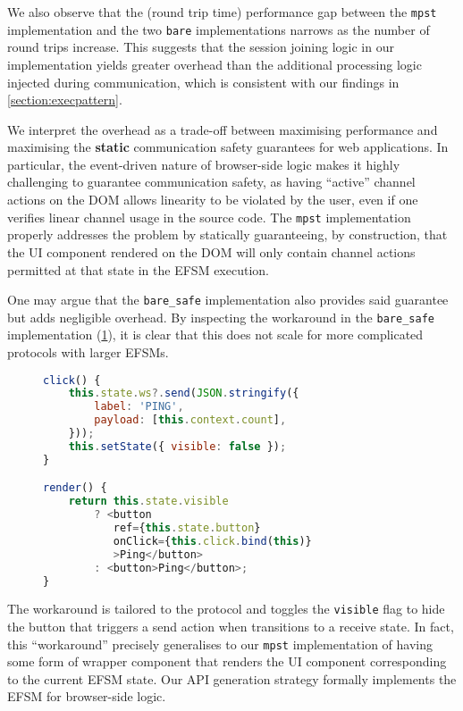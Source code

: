 We also observe that the (round trip time) performance gap between 
the \texttt{mpst} implementation and the two 
\texttt{bare} implementations narrows as the number of round trips 
increase. This suggests that the session joining logic in our
implementation yields greater overhead than the additional processing
logic injected during communication, which is consistent with 
our findings in \cref{section:execpattern}.

We interpret the overhead as a trade-off between maximising performance and
maximising the \textbf{static} communication safety guarantees for
web applications. In particular, the event-driven nature of 
browser-side logic makes it highly challenging to guarantee 
communication safety, as having ``active'' channel actions on the DOM
allows linearity to be violated by the user, even if one verifies
linear channel usage in the source code. The \texttt{mpst} implementation
properly addresses the problem by statically guaranteeing,
by construction, that the UI component rendered on the DOM will only
contain channel actions permitted at that state in the EFSM execution.

One may argue that the \texttt{bare_safe} implementation also
provides said guarantee but adds negligible overhead. 
By inspecting the workaround in the \texttt{bare_safe} implementation
(\cref{lst:workaround}),
it is clear that this does not scale for more complicated protocols with
larger EFSMs. 

\begin{figure}[!ht]
\begin{lstlisting}[language=javascript, tabsize=2]
click() {
	this.state.ws?.send(JSON.stringify({
		label: 'PING',
		payload: [this.context.count],
	}));
	this.setState({ visible: false });
}

render() {
	return this.state.visible 
		? <button
		   ref={this.state.button}
		   onClick={this.click.bind(this)}
		   >Ping</button>
		: <button>Ping</button>;
}
\end{lstlisting}
\label{lst:workaround}
\end{figure}

The workaround is tailored to the  protocol
and toggles the \texttt{visible} flag to hide the button that triggers
a send action when  transitions to a receive state.
In fact, this ``workaround'' precisely generalises to our 
\texttt{mpst} implementation of having some form of wrapper
component that renders the UI component corresponding to the
current EFSM state. Our API generation strategy formally implements
the EFSM for browser-side logic.

